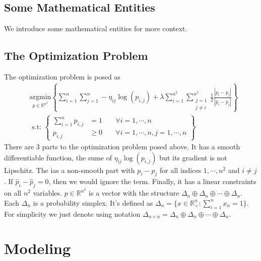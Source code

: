 \documentclass[11pt]{article}
\theoremstyle{definition}
\numberwithin{equation}{subsection}
\begin{document}
    \subsection{Some Mathematical Entities}
        We introduce some mathematical entities for more context. 

    \subsection{The Optimization Problem}
    The optimization problem is posed as 
        \begin{align}
            &\underset{p \in \mathbb R^{n^2}}{\text{argmin}} 
            \left\lbrace
                \sum_{i = 1}^{n}\sum_{j = 1}^{n}
                    -\eta_{ij}\log(p_{i, j})
                + 
                \lambda \sum_{i=1}^{n^2}\sum_{\substack{j=1\\j\neq i}}^{n^2}
                \frac{1}{2}
                \frac{|p_{i} - p_j|}{|\hat p_{i} - \hat p_j|}
                \right\rbrace
                \\
                &\text{ s.t: }
                \left\lbrace
                \begin{aligned}
                    \sum_{i = 1}^{n} p_{i, j} &= 1 \; && \forall i =1, \cdots, n 
                    \\
                    p_{i, j} &\ge 0\; &&\forall i= 1,\cdots, n, j = 1,\cdots, n 
                \end{aligned}
                \right\rbrace
            \label{eqn:original_formulaion}
        \end{align}
        There are 3 parts to the optimization problem posed above. 
        It has a smooth differentiable function, the sume of $\eta_{ij}\log(p_{i,j})$ but its gradient is not Lipschitz. 
        The ias a non-smooth part with $p_i - p_j$ for all indices $1,\cdots, n^2$ and $i\neq j$. 
        If $\hat p_i - \hat p_j = 0$, then we would ignore the term. 
        Finally, it has a linear constraints on all $n^2$ variables. 
        $p\in \mathbb R^{n^2}$ is a vector with the structure $\Delta_n\oplus\Delta_n\oplus \cdots \oplus \Delta_n$. 
        Each $\Delta_n$ is a probability simplex. 
        It's defined as $\Delta_n = \{x\in \mathbb R^n_+ : \sum_{i =1}^{n}x_n = 1\}$. 
        For simplicity we just denote using notation $\Delta_{n\times n} = \Delta_n\oplus\Delta_n\oplus \cdots \oplus \Delta_n$. 

\section{Modeling}
    
\end{document}
